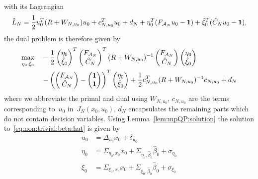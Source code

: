 %
with its Lagrangian
%
\begin{equation}
	\hat L_N = \frac{1}{2}u_0^T(R+W_{N,u_0})u_0+c_{N,u_0}^Tu_0+d_N + \eta_0^T(F_{\mathcal A_N}u_0-\mathbf{1}) + \hat\xi_0^T(\hat C_N u_0-\mathbf{1}),
\end{equation}
%
the dual problem is therefore given by
%
\begin{equation}\label{eq:dual:degenerate:problem:long:1}
	\begin{aligned}
	\max_{\eta_0,\hat\xi_0}&\quad - \frac{1}{2}\begin{pmatrix}\eta_0\\\hat\xi_0 \end{pmatrix}^T\begin{pmatrix}F_{\mathcal A_N}\\\hat C_N\end{pmatrix}^T(R+W_{N,u_0})^{-1}\begin{pmatrix}F_{\mathcal A_N}\\\hat C_N\end{pmatrix}\begin{pmatrix}\eta_0\\\hat\xi_0 \end{pmatrix}\\
	&\quad - \left(\begin{pmatrix}F_{\mathcal A_N}\\\hat C_N\end{pmatrix}-\begin{pmatrix}\mathbf{1}\\\mathbf{1}\end{pmatrix}\right)^T\begin{pmatrix}\eta_0\\\hat\xi_0 \end{pmatrix} +\frac{1}{2}c_{N,u_0}^T(R+W_{N,u_0})^{-1}c_{N,u_0} + d_N
	\end{aligned}
\end{equation}
%
where we abbreviate the primal and dual using $W_{N,u_0}$, $c_{N,u_0}$ are the terms corresponding to~$u_0$ in~$J_N(x_0,u_0)$, $d_N$ encapsulates the remaining parts which do not contain decision variables.
%
Using Lemma~\eqref{lem:mpQP:solution} the solution to~\eqref{eq:non:trivial:beta:hat} is given by
%
\begin{equation}
	\begin{aligned}
	u_0 &= \Delta_{u_0}x_0 + \delta_{u_0}\\
	\eta_0 &= \Sigma_{\eta_0,x_0} x_0 + \Sigma_{\eta_0,\hat\beta_0}\hat\beta_0 + \sigma_{\eta_0}\\
	\hat\xi_0 &= \Sigma_{\xi_0,x_0} x_0 + \Sigma_{\xi_0,\hat\beta_0}\hat\beta_0 + \sigma_{\xi_0}
	\end{aligned}
\end{equation}
